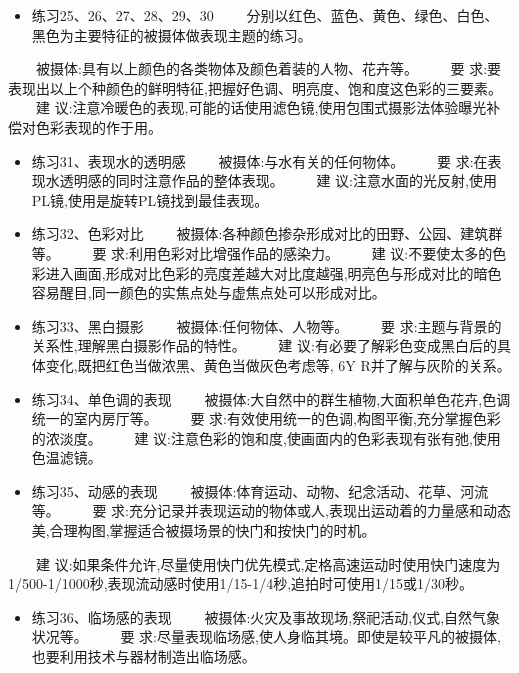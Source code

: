 \documentclass[
  letterpaper,
  DIV=11,
  numbers=noendperiod]{scrreprt}
\providecommand{\tightlist}{%
  \setlength{\itemsep}{0pt}\setlength{\parskip}{0pt}}\usepackage{longtable,booktabs,array}
\begin{document}
\begin{itemize}
\tightlist
\item
  练习25、26、27、28、29、30
  　　分别以红色、蓝色、黄色、绿色、白色、黑色为主要特征的被摄体做表现主题的练习。
\end{itemize}

　　被摄体:具有以上颜色的各类物体及颜色着装的人物、花卉等。 　　要
求:要表现出以上个种颜色的鲜明特征,把握好色调、明亮度、饱和度这色彩的三要素。
　　建
议:注意冷暖色的表现,可能的话使用滤色镜,使用包围式摄影法体验曝光补偿对色彩表现的作于用。

\begin{itemize}
\item
  练习31、表现水的透明感 　　被摄体:与水有关的任何物体。 　　要
  求:在表现水透明感的同时注意作品的整体表现。 　　建
  议:注意水面的光反射,使用PL镜,使用是旋转PL镜找到最佳表现。
\item
  练习32、色彩对比
  　　被摄体:各种颜色掺杂形成对比的田野、公园、建筑群等。 　　要
  求:利用色彩对比增强作品的感染力。 　　建
  议:不要使太多的色彩进入画面,形成对比色彩的亮度差越大对比度越强,明亮色与形成对比的暗色容易醒目,同一颜色的实焦点处与虚焦点处可以形成对比。
\item
  练习33、黑白摄影 　　被摄体:任何物体、人物等。 　　要
  求:主题与背景的关系性,理解黑白摄影作品的特性。 　　建
  议:有必要了解彩色变成黑白后的具体变化,既把红色当做浓黑、黄色当做灰色考虑等,
  6Y R并了解与灰阶的关系。
\item
  练习34、单色调的表现
  　　被摄体:大自然中的群生植物,大面积单色花卉,色调统一的室内房厅等。
  　　要 求:有效使用统一的色调,构图平衡,充分掌握色彩的浓淡度。 　　建
  议:注意色彩的饱和度,使画面内的色彩表现有张有弛,使用色温滤镜。
\item
  练习35、动感的表现 　　被摄体:体育运动、动物、纪念活动、花草、河流等。
  　　要
  求:充分记录并表现运动的物体或人,表现出运动着的力量感和动态美,合理构图,掌握适合被摄场景的快门和按快门的时机。
\end{itemize}

　　建
议:如果条件允许,尽量使用快门优先模式,定格高速运动时使用快门速度为1/500-1/1000秒,表现流动感时使用1/15-1/4秒,追拍时可使用1/15或1/30秒。

\begin{itemize}
\tightlist
\item
  练习36、临场感的表现
  　　被摄体:火灾及事故现场,祭祀活动,仪式,自然气象状况等。 　　要
  求:尽量表现临场感,使人身临其境。即使是较平凡的被摄体,也要利用技术与器材制造出临场感。
\end{itemize}
\end{document}

